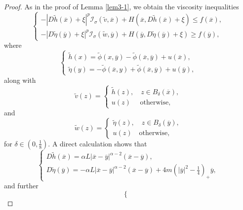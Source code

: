 \documentclass[11pt,reqno]{amsart}
\numberwithin{equation}{section}
\begin{document}
\begin{proof}
As in the proof of Lemma \ref{lem3-1}, we obtain the viscosity inequalities
\begin{equation}
\label{3-2-4}
\begin{cases}
-|D\widetilde{h}(\overline{x})+\xi|^p\mathcal{I}_\sigma(\widetilde{v},\overline{x})+H(\overline{x},D\widetilde{h}(\overline{x})+\xi)\le f(\overline{x}),\\
-|D\widetilde{\eta}(\overline{y})+\xi|^p\mathcal{I}_\sigma(\widetilde{w},\overline{y})+H(\overline{y},D\widetilde{\eta}(\overline{y})+\xi)\ge f(\overline{y}),
\end{cases}
\end{equation}
where
\begin{equation*}
\begin{cases}
\widetilde{h}(x)=\widetilde{\phi}(x,\overline{y})-\widetilde{\phi}(\overline{x},\overline{y})+u(\overline{x}),\\
\widetilde{\eta}(y)=-\widetilde{\phi}(\overline{x},y)+\widetilde{\phi}(\overline{x},\overline{y})+u(\overline{y}),
\end{cases}
\end{equation*}
along with
\begin{equation*}
\widetilde{v}(z)=\begin{cases}\widetilde{h}(z),\quad z\in B_\delta(\overline{x}),\\
u(z)\quad\text{ otherwise},
\end{cases}
\end{equation*}
and
\begin{equation*}
\widetilde{w}(z)=\begin{cases}\widetilde{\eta}(z),\quad z\in B_\delta(\overline{y}),\\
u(z)\quad\text{otherwise},
\end{cases}
\end{equation*}
for $\delta\in(0,\frac18)$. A direct calculation shows that
\begin{equation*}
\begin{cases}
D\widetilde{h}(\overline{x})=\alpha L|\overline{x}-\overline{y}|^{\alpha-2}(\overline{x}-\overline{y}),\\
D\widetilde{\eta}(\overline{y})=-\alpha L|\overline{x}-\overline{y}|^{\alpha-2}(\overline{x}-\overline{y})+4m\left(|\overline{y}|^2-\frac{1}{4}\right)_+\overline{y},
\end{cases}
\end{equation*}
and further
\begin{equation*}
\begin{cases}

\end{cases}
\end{equation*}
\end{proof}
\end{document}
